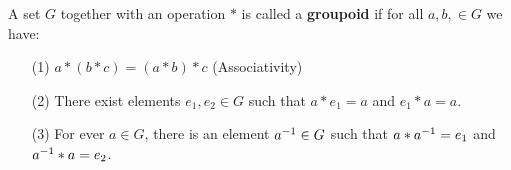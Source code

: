 \begin{definition}
    A set $G$ together with an operation  $\ast$ is called a  \textbf{groupoid}
    if for all $a,b, \in G$ we have:
    \begin{enumerate}
        \item[(1)] $a \ast (b \ast c)=(a \ast b) \ast c$ (Associativity)

        \item[(2)] There exist elements $e_1,e_2 \in G$ such that $a \ast e_1=a$
            and $e_1 \ast a=a$.

        \item[(3)] For ever $a \in G$, there is an element  $a^{-1} \in G$ such
            that $a \ast a^{-1}=e_1$ and $a^{-1} \ast a=e_2$.
    \end{enumerate}
\end{definition}

